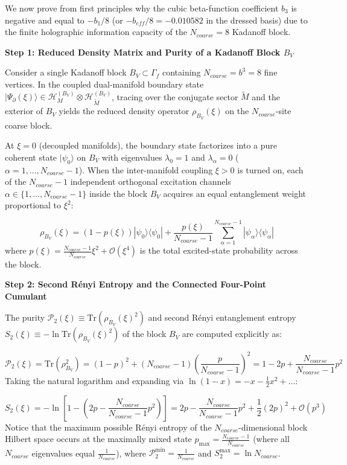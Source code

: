\documentclass[aps,prd,onecolumn,superscriptaddress,nofootinbib,longbibliography,10pt]{revtex4-2}
\begin{document}
{{  We now prove from first principles why the cubic beta-function coefficient \(b_3\) is negative and equal to \(-b_1/8\) (or \(-b_{eff}/8 = -0.010582\) in the dressed basis) due to the finite holographic information capacity of the \(N_{coarse} = 8\) Kadanoff block.


  \textbf{Step 1: Reduced Density Matrix and Purity of a Kadanoff Block \(B_V\)}


  Consider a single Kadanoff block \(B_V \subset \Gamma_f\) containing \(N_{coarse} = b^3 = 8\) fine vertices. In the coupled dual-manifold boundary state \(|\Psi_\partial(\xi)\rangle \in \mathcal{H}_M^{(B_V)} \otimes \mathcal{H}_{\tilde{M}}^{(B_V)}\), tracing over the conjugate sector \(\tilde{M}\) and the exterior of \(B_V\) yields the reduced density operator \(\rho_{B_V}(\xi)\) on the \(N_{coarse}\)-site coarse block.


  At \(\xi = 0\) (decoupled manifolds), the boundary state factorizes into a pure coherent state \(|\psi_0\rangle\) on \(B_V\) with eigenvalues \(\lambda_0 = 1\) and \(\lambda_\alpha = 0\) (\(\alpha = 1, \dots, N_{coarse} - 1\)). When the inter-manifold coupling \(\xi > 0\) is turned on, each of the \(N_{coarse} - 1\) independent orthogonal excitation channels \(\alpha \in \{1, \dots, N_{coarse} - 1\}\) inside the block \(B_V\) acquires an equal entanglement weight proportional to \(\xi^2\):


  \[ \rho_{B_V}(\xi) = (1 - p(\xi))|\psi_0\rangle\langle\psi_0| + \frac{p(\xi)}{N_{coarse} - 1}\sum_{\alpha=1}^{N_{coarse}-1} |\psi_\alpha\rangle\langle\psi_\alpha| \]
  where \(p(\xi) = \frac{N_{coarse}-1}{N_{coarse}}\xi^2 + \mathcal{O}(\xi^4)\) is the total excited-state probability across the block.


  \textbf{Step 2: Second Rényi Entropy and the Connected Four-Point Cumulant}


  The purity \(\mathcal{P}_2(\xi) \equiv \text{Tr}(\rho_{B_V}(\xi)^2)\) and second Rényi entanglement entropy \(S_2(\xi) \equiv -\ln\text{Tr}(\rho_{B_V}(\xi)^2)\) of the block \(B_V\) are computed explicitly as:


  \[ \mathcal{P}_2(\xi) = \text{Tr}(\rho_{B_V}^2) = (1 - p)^2 + (N_{coarse} - 1)\left(\frac{p}{N_{coarse} - 1}\right)^2 = 1 - 2p + \frac{N_{coarse}}{N_{coarse} - 1}p^2 \]
  Taking the natural logarithm and expanding via \(\ln(1 - x) = -x - \frac{1}{2}x^2 + \dots\):


  \[ S_2(\xi) = -\ln\left[ 1 - \left(2p - \frac{N_{coarse}}{N_{coarse} - 1}p^2\right) \right] = 2p - \frac{N_{coarse}}{N_{coarse} - 1}p^2 + \frac{1}{2}(2p)^2 + \mathcal{O}(p^3) \]
  Notice that the maximum possible Rényi entropy of the \(N_{coarse}\)-dimensional block Hilbert space occurs at the maximally mixed state \(p_{\max} = \frac{N_{coarse}-1}{N_{coarse}}\) (where all \(N_{coarse}\) eigenvalues equal \(\frac{1}{N_{coarse}}\)), where \(\mathcal{P}_2^{\min} = \frac{1}{N_{coarse}}\) and \(S_2^{\max} = \ln N_{coarse}\).


}}
\end{document}
